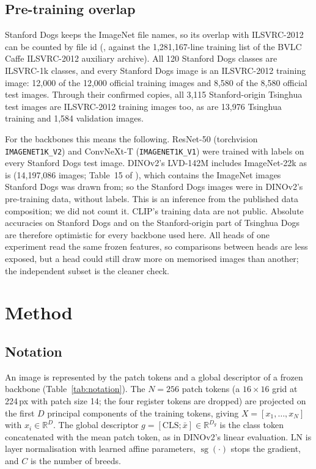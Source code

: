 \documentclass[11pt,a4paper]{article}
\theoremstyle{plain}
\newcommand{\fn}[1]{\texttt{\detokenize{#1}}}
\newcommand{\R}{\mathbb{R}}
\newcommand{\LN}{\mathrm{LN}}
\newcommand{\sg}{\operatorname{sg}}
\begin{document}
\subsection{Pre-training overlap}\label{sec:pretrain-overlap}
Stanford Dogs keeps the ImageNet file names, so its overlap with ILSVRC-2012 can be counted by file id
(\fn{scripts/ilsvrc_overlap.py}, against the 1,281,167-line training list \fn{train.txt} of the BVLC Caffe ILSVRC-2012
auxiliary archive). All 120 Stanford Dogs classes are ILSVRC-1k classes, and every Stanford Dogs image is an
ILSVRC-2012 training image: 12,000 of the 12,000 official training images and 8,580 of the 8,580 official test images.
Through their confirmed copies, all 3,115 Stanford-origin Tsinghua test images are ILSVRC-2012 training images too,
as are 13,976 Tsinghua training and 1,584 validation images.

For the backbones this means the following. ResNet-50 (torchvision \texttt{IMAGENET1K\_V2}) and ConvNeXt-T
(\texttt{IMAGENET1K\_V1}) were trained with labels on every Stanford Dogs test image. DINOv2's LVD-142M includes
ImageNet-22k as is (14,197,086 images; Table~15 of \citet{oquab2024dinov2}), which contains the ImageNet images
Stanford Dogs was drawn from; so the Stanford Dogs images were in DINOv2's pre-training data, without labels. This
is an inference from the published data composition; we did not count it. CLIP's training data are not public.
Absolute accuracies on Stanford Dogs and on the Stanford-origin part of Tsinghua Dogs are therefore optimistic for
every backbone used here. All heads of one experiment read the same frozen features, so comparisons between heads
are less exposed, but a head could still draw more on memorised images than another; the independent subset is the
cleaner check.

\section{Method}\label{sec:method}

\subsection{Notation}\label{sec:notation}
An image is represented by the patch tokens and a global descriptor of a frozen backbone
(Table~\ref{tab:notation}). The $N=256$ patch tokens (a $16\times16$ grid at 224\,px with patch size 14; the four
register tokens are dropped) are projected on the first $D$ principal components of the training tokens, giving
$X=[x_1,\dots,x_N]$ with $x_i\in\R^D$. The global descriptor $g=[\mathrm{CLS};\bar x]\in\R^{D_g}$ is the class token
concatenated with the mean patch token, as in DINOv2's linear evaluation. $\LN$ is layer normalisation with learned
affine parameters, $\sg(\cdot)$ stops the gradient, and $C$ is the number of breeds.
\end{document}
